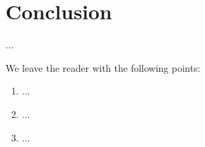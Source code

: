 \section{Conclusion}\label{sec:HS_conclusion}

...

We leave the reader with the following points:

\begin{enumerate}
	\item{...}
	\item{...}
	\item{...}
\end{enumerate}